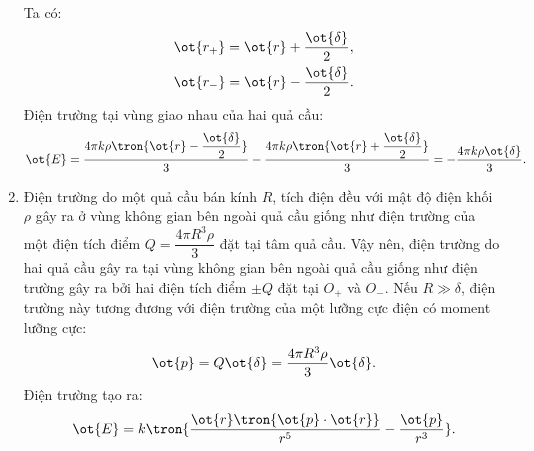\begin{loigiai}
\begin{enumerate}[1)]
\begin{center}
        \end{center}
        Ta có:
        \begin{equation*}
            \begin{aligned}
                 &\ot{r_+}=\ot{r}+\dfrac{\ot{\delta}}{2},\\
                 &\ot{r_-}=\ot{r}-\dfrac{\ot{\delta}}{2}.
            \end{aligned}
        \end{equation*}
        Điện trường tại vùng giao nhau của hai quả cầu:
        \begin{equation*}
            \ot{E}=\dfrac{4\pi k\rho \tron{\ot{r}-\dfrac{\ot{\delta}}{2}}}{3}-\dfrac{4\pi k\rho\tron{\ot{r}+\dfrac{\ot{\delta}}{2}}}{3}=-\dfrac{4\pi k\rho\ot{\delta}}{3}.
        \end{equation*}
       \item Điện trường do một quả cầu bán kính $R$, tích điện đều với mật độ điện khối $\rho$ gây ra ở vùng không gian bên ngoài quả cầu giống như điện trường của một điện tích điểm $Q=\dfrac{4\pi R^3 \rho}{3}$ đặt tại tâm quả cầu. Vậy nên, điện trường do hai quả cầu gây ra tại vùng không gian bên ngoài quả cầu giống như điện trường gây ra bởi hai điện tích điểm $\pm Q$ đặt tại $O_+$ và $O_-$. Nếu $R\gg \delta$, điện trường này tương đương với điện trường của một lưỡng cực điện có moment lưỡng cực:
        $$\ot{p}=Q\ot{\delta}=\dfrac{4\pi R^3\rho}{3}\ot{\delta} . $$
        Điện trường tạo ra:
        $$\ot{E}=k\tron{\dfrac{\ot{r}\tron{\ot{p}\cdot\ot{r}}}{r^5}-\dfrac{\ot{p}}{r^3}}.$$
    \end{enumerate}
    \end{loigiai}
    
    
    
